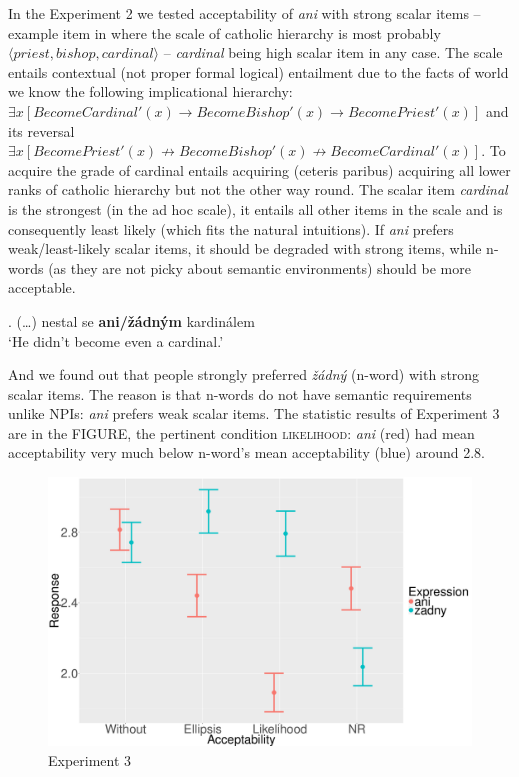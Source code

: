 \documentclass[12pt]{scrartcl}
\begin{document}
In the Experiment 2 we tested acceptability of \emph{ani} with strong scalar items -- example item in \Next where the scale of catholic hierarchy is most probably $\langle priest, bishop, cardinal\rangle$ -- \textit{cardinal} being high scalar item in any case. The scale entails contextual (not proper formal logical) entailment due to the facts of world we know the following implicational hierarchy: $\exists x[BecomeCardinal'(x) \rightarrow BecomeBishop'(x) \rightarrow BecomePriest'(x)]$ and its reversal $\exists x[BecomePriest'(x) \not\rightarrow BecomeBishop'(x) \not\rightarrow BecomeCardinal'(x)]$. To acquire the grade of cardinal entails acquiring (ceteris paribus) acquiring all lower ranks of catholic hierarchy but not the other way round. The scalar item \textit{cardinal} is the strongest (in the ad hoc scale), it entails all other items in the scale and is consequently least likely (which fits the natural intuitions). If \textit{ani} prefers weak/least-likely scalar items, it should be degraded with strong items, while n-words (as they are not picky about semantic environments) should be more acceptable.

\ex. (\ldots{}) nestal se \textbf{ani/žádným} kardinálem\\
`He didn't become even a cardinal.'

And we found out that people strongly preferred \emph{žádný} (n-word) with strong scalar items. The reason is that n-words do not have semantic requirements unlike NPIs: \textit{ani} prefers weak scalar items. The statistic results of Experiment 3 are in the FIGURE, the pertinent condition \textsc{likelihood}: \textit{ani} (red) had mean acceptability very much below n-word's mean acceptability (blue) around 2.8. 

\begin{figure}
\centering
\includegraphics{include/mean-sum.png}
\caption{Experiment 3}
\end{figure}
\end{document}

